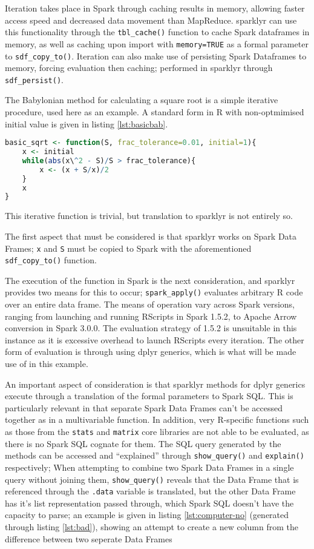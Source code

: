 \documentclass[10pt,a4paper]{article}
\begin{document}
Iteration takes place in Spark through caching results in memory, allowing
faster access speed and decreased data movement than
MapReduce\cite{zaharia2010spark}.
sparklyr can use this functionality through the \texttt{tbl\_cache()} function
to cache Spark dataframes in memory, as well as caching upon import with
\texttt{memory=TRUE} as a formal parameter to \texttt{sdf\_copy\_to()}. 
Iteration can also make use of persisting Spark Dataframes to memory, forcing
evaluation then caching; performed in sparklyr through \texttt{sdf\_persist()}.

The Babylonian method for calculating a square root is a simple iterative
procedure, used here as an example.
A standard form in R with non-optmimised initial value is given in listing
\ref{lst:basicbab}.

\begin{lstlisting}[language=R, caption={Simple Iteration with the Babylonian Method}, label=lst:basicbab]
basic_sqrt <- function(S, frac_tolerance=0.01, initial=1){
	x <- initial
	while(abs(x\^2 - S)/S > frac_tolerance){
		x <- (x + S/x)/2
	}
	x
}
\end{lstlisting}

This iterative function is trivial, but translation to sparklyr is not entirely so.

The first aspect that must be considered is that sparklyr works on Spark Data
Frames;
\texttt{x} and \texttt{S} must be copied to Spark with the aforementioned
\texttt{sdf\_copy\_to()} function.

The execution of the function in Spark is the next consideration, and sparklyr
provides two means for this to occur;
\texttt{spark\_apply()} evaluates arbitrary R code over an entire data frame.
The means of operation vary across Spark versions, ranging from launching and
running RScripts in Spark 1.5.2, to Apache Arrow conversion in Spark 3.0.0. 
The evaluation strategy of 1.5.2 is unsuitable in this instance as it is
excessive overhead to launch RScripts every iteration. 
The other form of evaluation is through using dplyr generics, which is what
will be made use of in this example.

An important aspect of consideration is that sparklyr methods for dplyr
generics execute through a translation of the formal parameters to Spark SQL.
This is particularly relevant in that separate Spark Data Frames can't be
accessed together as in a multivariable function.
In addition, very R-specific functions such as those from the \texttt{stats}
and \texttt{matrix} core libraries are not able to be evaluated, as there is no
Spark SQL cognate for them.
The SQL query generated by the methods can be accessed and ``explained''
through \texttt{show\_query()} and \texttt{explain()} respectively;
When attempting to combine two Spark Data Frames in a single query without 
joining them, \texttt{show\_query()} reveals that the Data Frame that is
referenced through the \texttt{.data} variable is translated, but the other
Data Frame has it's list representation passed through, which Spark SQL doesn't
have the capacity to parse; 
an example is given in listing \ref{lst:computer-no} (generated through listing
\ref{lst:bad}), showing an attempt to create a new column from the difference
between two seperate Data Frames
\end{document}

